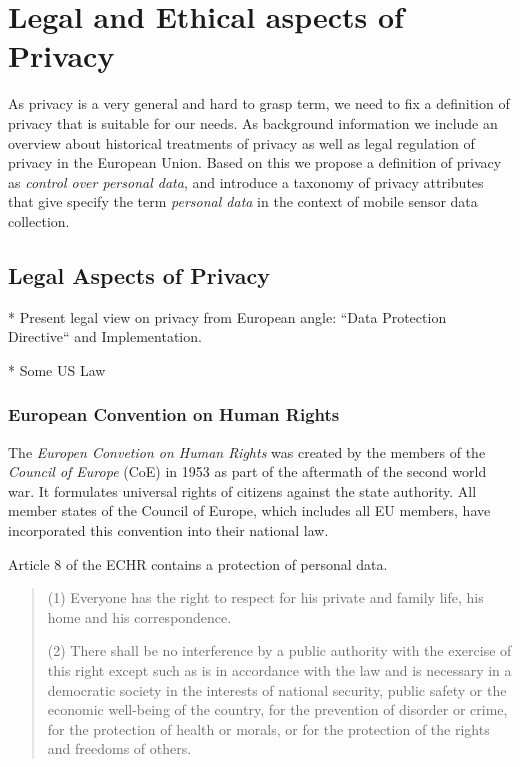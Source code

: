 \chapter{Legal and Ethical aspects of Privacy}
\label{chap:privacy}

\newcommand{\om}{[...]\xspace} %

As privacy is a very general and hard to grasp term, we need to fix a definition of privacy that is suitable for our needs.
As background information we include an overview about historical treatments of privacy as well as legal regulation of privacy in the European Union.
Based on this we propose a definition of privacy as {\em control over personal data}, and introduce a taxonomy of privacy attributes that give specify the term {\em personal data} in the context of mobile sensor data collection.


\section{Legal Aspects of Privacy}

* Present legal view on privacy from European angle: ``Data Protection Directive`` and Implementation.

* Some US Law

\subsection{European Convention on Human Rights}

The \emph{Europen Convetion on Human Rights} \cite{ECHR} was created by the members of the \emph{Council of Europe} (CoE) in 1953 as part of the aftermath of the second world war.
It formulates universal rights of citizens against the state authority.
All member states of the Council of Europe, which includes all EU members, have incorporated this convention into their national law.

Article 8 of the ECHR contains a protection of personal data.

\begin{quote}
(1) Everyone has the right to respect for his private and family life, his home and his correspondence.

(2) There shall be no interference by a public authority with the exercise of this right except such as is in accordance with the law and is necessary in a democratic society in the interests of national security, public safety or the economic well-being of the country, for the prevention of disorder or crime, for the protection of health or morals, or for the protection of the rights and freedoms of others.
\end{quote}

